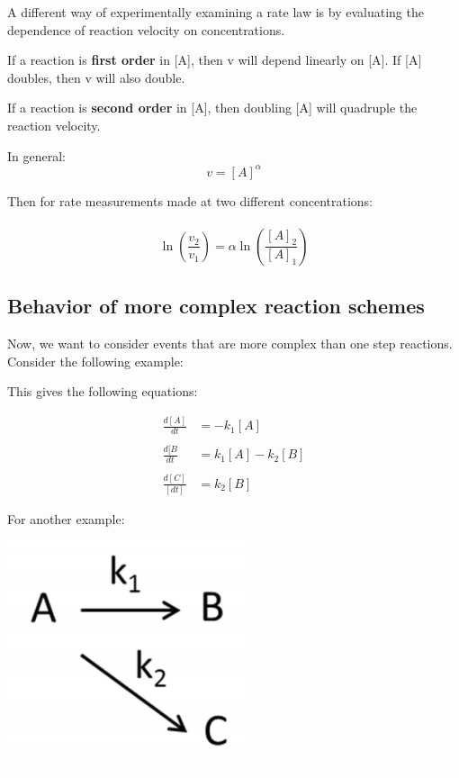 \documentclass[12pt, letterpaper]{article}
\begin{document}
    A different way of experimentally examining a rate law is by evaluating the 
    dependence of reaction velocity on concentrations. 

    If a reaction is \textbf{first order} in [A], then v will depend linearly on [A]. 
    If [A] doubles, then v will also double. 

    If a reaction is \textbf{second order} in [A], then doubling [A] will quadruple the 
    reaction velocity. 

    In general: 
    \begin{equation}
        v = [A]^{\alpha}
    \end{equation}

    Then for rate measurements made at two different concentrations: \\ \\
    \begin{equation}
        \ln(\frac{v_2}{v_1}) = \alpha \ln(\frac{[A]_2}{[A]_1})
    \end{equation}

    \subsection*{Behavior of more complex reaction schemes}

    Now, we want to consider events that are more complex than one step reactions. Consider 
    the following example: 

    \begin{center}
        
    \end{center}
   
    This gives the following equations:

    \begin{align*}
        \frac{d[A]}{dt} &= -k_1[A] \\ \\
        \frac{d[B}{dt} &= k_1[A] - k_2[B] \\ \\
        \frac{d[C]}{[dt]} &= k_2[B]  
    \end{align*}
    
    \newpage
    For another example: 

    \begin{center}
        \includegraphics[scale = 0.5]{Complex Reaction.png}
    \end{center}
\end{document}
